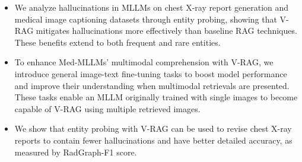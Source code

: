 \begin{itemize}
\item We analyze hallucinations in MLLMs on chest X-ray report generation and medical image captioning datasets through entity probing, showing that V-RAG mitigates hallucinations more effectively than baseline RAG techniques. These benefits extend to both frequent and rare entities.

\item  To enhance Med-MLLMs' multimodal comprehension with V-RAG, we introduce general image-text fine-tuning tasks to boost model performance and improve their understanding when multimodal retrievals are presented. These tasks enable an MLLM originally trained with single images to become capable of V-RAG using multiple retrieved images.

\item We show that entity probing with V-RAG can be used to revise
chest X-ray reports to contain fewer hallucinations and have better 
detailed accuracy, as measured by RadGraph-F1 score.

\end{itemize}


